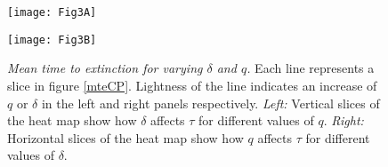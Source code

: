 \iffalse
\begin{figure}[h]
	\centering
	\subfloat[\emph{Varying $\delta$}]{\texttt{[image: Figure3-A]}\label{mte:delta}}
	\hfill
	\subfloat[\emph{Varying $q$} ]{\texttt{[image: Figure3-B]}\label{mte:q}}
	\caption{\emph{Mean time to extinction for varying $\delta$ and $q$.} Each line represents a slice in Figure \ref{mteCP}: Figure \ref{mte:delta} are vertical slices which show how, for different values of $q$, the $\delta$ affects $\tau$. Similarly Figure \ref{mte:q} are horizontal slices which show how, for different values of $\delta$, the $q$ affects $\tau$. As in Figure \ref{qsd}, lightness of the line indicates an increase of \ref{mte:delta} $q$ and \ref{mte:q} $\delta$}
	\label{mte}
\end{figure}
\fi
\begin{figure}[h]
	\centering
	\begin{minipage}{0.49\linewidth}
		\centering
		\texttt{[image: Fig3A]}
	\end{minipage}
	\begin{minipage}{0.49\linewidth}
		\centering
		\texttt{[image: Fig3B]}
	\end{minipage}
	\caption{\emph{Mean time to extinction for varying $\delta$ and $q$.} Each line represents a slice in figure \ref{mteCP}. Lightness of the line indicates an increase of $q$ or $\delta$ in the left and right panels respectively. 
	\emph{Left:} Vertical slices of the heat map show how $\delta$ affects $\tau$ for different values of $q$. 
	\emph{Right:} Horizontal slices of the heat map show how $q$ affects $\tau$ for different values of $\delta$. 
	}
	\label{mte}
\end{figure}

